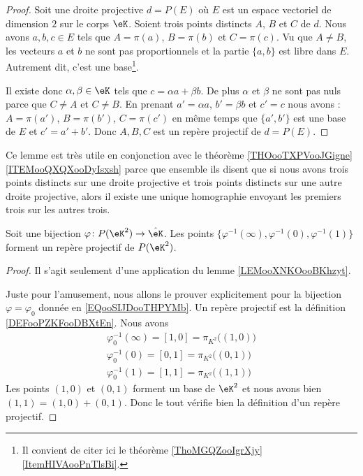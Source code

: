 \begin{proof}
    Soit une droite projective \( d=P(E)\) où \( E\) est un espace vectoriel de dimension \( 2\) sur le corps \( \eK\). Soient trois points distincts \( A\), \( B\) et \( C\) de \( d\). Nous avons \( a,b,c\in E\) tels que \( A=\pi(a)\), \( B=\pi(b)\) et \( C=\pi(c)\). Vu que \( A\neq B\), les vecteurs \( a\) et \( b\) ne sont pas proportionnels et la partie \( \{ a,b \}\) est libre dans \( E\). Autrement dit, c'est une base\footnote{Il convient de citer ici le théorème \ref{ThoMGQZooIgrXjy}\ref{ItemHIVAooPnTlsBi}.}. 
            
    Il existe donc \( \alpha,\beta\in \eK\) tels que \( c=\alpha a+\beta b\). De plus \( \alpha\) et \( \beta\) ne sont pas nuls parce que \( C\neq A\) et \( C\neq B\). En prenant \( a'=\alpha a\), \( b'=\beta b\) et \( c'=c\) nous avons : $A=\pi(a')$, $B=\pi(b')$, $C=\pi(c')$ en même temps que \( \{ a',b' \}\) est une base de \( E\) et \( c'=a'+b'\). Donc \( A,B,C\) est un repère projectif de \( d=P(E)\).
\end{proof}

Ce lemme est très utile en conjonction avec le théorème \ref{THOooTXPVooJGigne}\ref{ITEMooQXQXooDyIsxsh} parce que ensemble ils disent que si nous avons trois points distincts sur une droite projective et trois points distincts sur une autre droite projective, alors il existe une unique homographie envoyant les premiers trois sur les autres trois.

\begin{corollary}       \label{CORooFJSCooNOeAel}
    Soit une bijection \( \varphi\colon P(\eK^2)\to \hat\eK\). Les points \( \{ \varphi^{-1}(\infty), \varphi^{-1}(0), \varphi^{-1}(1) \}\) forment un repère projectif de \( P(\eK^2)\).
\end{corollary}

\begin{proof}
    Il s'agit seulement d'une application du lemme \ref{LEMooXNKOooBKhzyt}.

    Juste pour l'amusement, nous allons le prouver explicitement pour la bijection \( \varphi=\varphi_0\) donnée en \eqref{EQooSIJDooTHPYMb}. Un repère projectif est la définition \ref{DEFooPZKFooDBXtEn}. Nous avons
    \begin{subequations}
        \begin{align}
            \varphi_0^{-1}(\infty)=[1,0]=\pi_{K^2}\big( (1,0) \big)\\
            \varphi_0^{-1}(0)=[0,1]=\pi_{K^2}\big( (0,1) \big)\\
            \varphi_0^{-1}(1)=[1,1]=\pi_{K^2}\big( (1,1) \big)
        \end{align}
    \end{subequations}
    Les points \( (1,0)\) et \( (0,1)\) forment un base de \( \eK^2\) et nous avons bien \( (1,1)=(1,0)+(0,1)\). Donc le tout vérifie bien la définition d'un repère projectif.
\end{proof}


